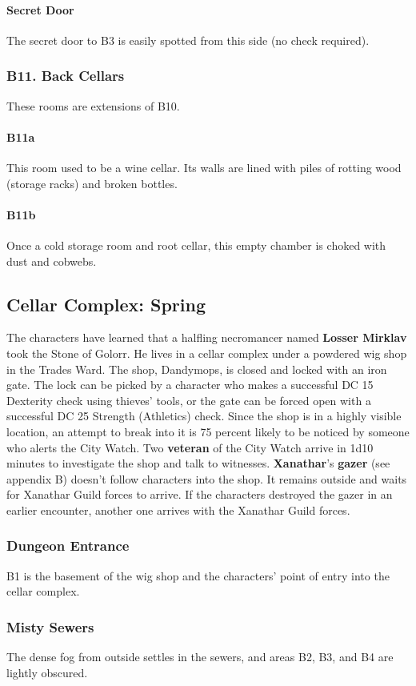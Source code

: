 \documentclass[10pt,a4paper,twoside,twocolumn,openany,nodeprecatedcode]{dndbook}
\begin{document}
\paragraph{Secret Door}
The secret door to B3 is easily spotted from this side (no check required).
\subsubsection{B11. Back Cellars}
These rooms are extensions of B10.
\paragraph{B11a}
This room used to be a wine cellar. Its walls are lined with piles of rotting wood (storage racks) and broken bottles.
\paragraph{B11b}
Once a cold storage room and root cellar, this empty chamber is choked with dust and cobwebs.
\subsection{Cellar Complex: Spring}
The characters have learned that a halfling necromancer named \textbf{Losser Mirklav} took the Stone of Golorr. He lives in a cellar complex under a powdered wig shop in the Trades Ward. The shop, Dandymops, is closed and locked with an iron gate. The lock can be picked by a character who makes a successful DC 15 Dexterity check using thieves' tools, or the gate can be forced open with a successful DC 25 Strength (Athletics) check. Since the shop is in a highly visible location, an attempt to break into it is 75 percent likely to be noticed by someone who alerts the City Watch. Two \textbf{veteran} of the City Watch arrive in 1d10 minutes to investigate the shop and talk to witnesses.
\textbf{Xanathar}'s \textbf{gazer} (see appendix B) doesn't follow characters into the shop. It remains outside and waits for Xanathar Guild forces to arrive. If the characters destroyed the gazer in an earlier encounter, another one arrives with the Xanathar Guild forces.
\subsubsection{Dungeon Entrance}
B1 is the basement of the wig shop and the characters' point of entry into the cellar complex.
\subsubsection{Misty Sewers}
The dense fog from outside settles in the sewers, and areas B2, B3, and B4 are lightly obscured.
\end{document}
